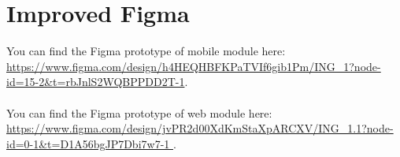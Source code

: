 \documentclass[a4paper,12pt]{report}
\begin{document}
	\section{Improved Figma}
	You can find the Figma prototype of mobile module here: \url{https://www.figma.com/design/h4HEQHBFKPaTVIf6gib1Pm/ING_1?node-id=15-2&t=rbJnlS2WQBPPDD2T-1}.
	\\
	\\
	You can find the Figma prototype of web module here: \url{https://www.figma.com/design/jvPR2d00XdKmStaXpARCXV/ING_1.1?node-id=0-1&t=D1A56bgJP7Dbi7w7-1  }.
	
	
	
	
	
\end{document}
